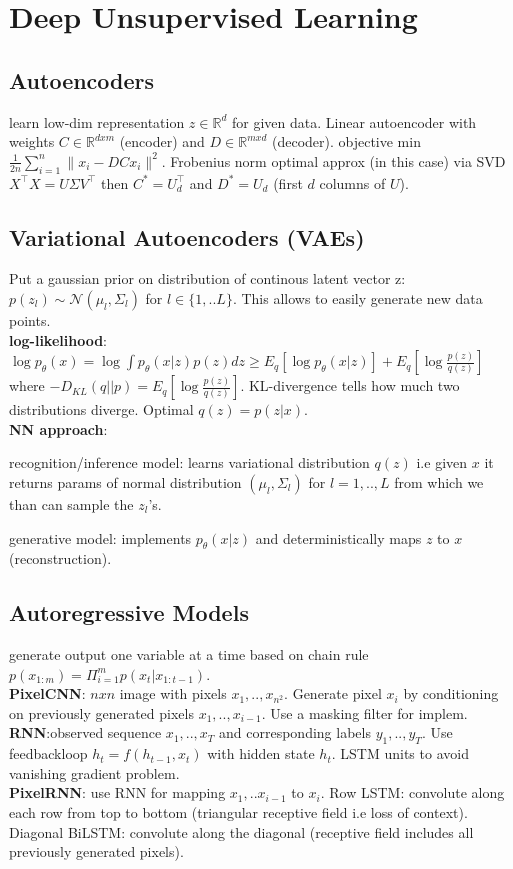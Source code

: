 \section{Deep Unsupervised Learning}
\subsection*{Autoencoders}
learn low-dim representation $z \in \mathbb{R}^d$ for given data. 
Linear autoencoder with weights $C \in \mathbb{R}^{dxm}$ (encoder) and $D \in \mathbb{R}^{mxd}$ (decoder). objective min $\frac{1}{2n} \sum_{i=1}^n \|x_i-DCx_i \|^2$. Frobenius norm optimal approx (in this case) via SVD $X^\top X=U\Sigma V^\top$ then $C^*=U_d^\top$ and $D^*=U_d$ (first $d$ columns of $U$).
\subsection*{Variational Autoencoders (VAEs)}
Put a gaussian prior on distribution of continous latent vector z: $p(z_l) \sim \mathcal{N}(\mu_l, \Sigma_l)$ for $l \in \{1,..L\}$. This allows to easily generate new data points. \\
\textbf{log-likelihood}: $\log p_\theta(x) = \log \int p_\theta (x|z) p(z) dz \geq E_q[\log p_\theta(x|z)] + E_q[\log \frac{p(z)}{q(z)}]$ where $-D_{KL}(q||p) = E_q[\log \frac{p(z)}{q(z)}]$. KL-divergence tells how much two distributions diverge. Optimal $q(z)=p(z|x)$. \\
\textbf{NN approach}: 
\begin{inparaenum}
\item recognition/inference model: learns variational distribution $q(z)$ i.e given $x$ it returns params of normal distribution $(\mu_l,\Sigma_l)$ for $l=1,..,L$ from which we than can sample the $z_l$'s. 
\item generative model: implements $p_\theta(x|z)$ and deterministically maps $z$ to $x$ (reconstruction). 
\end{inparaenum}
\subsection*{Autoregressive Models}
generate output one variable at a time based on chain rule $p(x_{1:m}) = \Pi_{i=1}^m p(x_t|x_{1:t-1})$. \\
\textbf{PixelCNN}: $nxn$ image with pixels $x_1,..,x_{n^2}$. Generate pixel $x_i$ by conditioning on previously generated pixels $x_1,..,x_{i-1}$. Use a masking filter for implem. \\
\textbf{RNN}:observed sequence $x_1,..,x_T$ and corresponding labels $y_1,..,y_T$. Use feedbackloop $h_t=f(h_{t-1},x_t)$ with hidden state $h_t$. LSTM units to avoid vanishing gradient problem. \\
\textbf{PixelRNN}: use RNN for mapping $x_1,..x_{i-1}$ to $x_i$. Row LSTM: convolute along each row from top to bottom (triangular receptive field i.e loss of context). Diagonal BiLSTM: convolute along the diagonal (receptive field includes all previously generated pixels).
